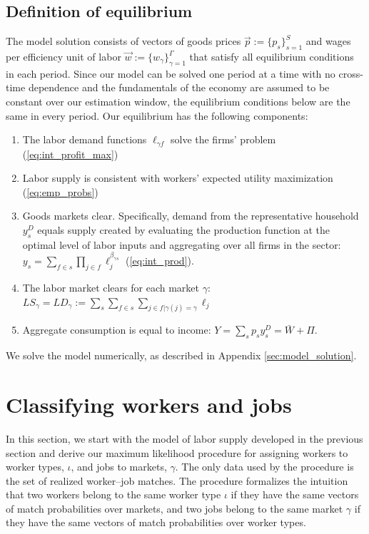 \documentclass[12pt]{article}
\def\g{\gamma}
\def\i{\iota}
\theoremstyle{definition}
\theoremstyle{plain}
\begin{document}
\subsection{Definition of equilibrium}


The model solution consists of vectors of goods prices $\vec{p} := \{p_{s}\}_{s=1}^S$ and wages per efficiency unit of labor $\vec{w} := \{w_{\g}\}_{\g=1}^\Gamma$ that satisfy all equilibrium conditions in each period. Since our model can be solved one period at a time with no cross-time dependence and the fundamentals of the economy are assumed to be constant over our estimation window, the equilibrium conditions below are the same in every period. Our equilibrium has the following components:
\begin{enumerate} 
	\item The labor demand functions $\ell_{\g f}$ solve the firms' problem (\ref{eq:int_profit_max})
	\item Labor supply is consistent with workers' expected utility maximization (\ref{eq:emp_probs})
	\item Goods markets clear. Specifically, demand from the representative household $y_s^D$ equals supply created by evaluating the production function at the optimal level of labor inputs and aggregating over all firms in the sector: $y_s = \sum_{f \in s} \prod_{j \in f} \ell_{j}^{\beta_{\g s}} $ (\ref{eq:int_prod}).
	\item The labor market clears for each market $\g$: $LS_\g = LD_\g := \sum_s \sum_{f \in s} \sum_{j \in f | \g(j)=\g} \ell_{j}$
	\item Aggregate consumption is equal to income: $Y = \sum_{s} p_s y_s^D = \bar W + \Pi$.
\end{enumerate}
We solve the model numerically, as described in Appendix \ref{sec:model_solution}. 


\section{Classifying workers and jobs}


In this section, we start with the model of labor supply developed in the previous section and derive our maximum likelihood procedure for assigning workers to worker types, $\i$, and jobs to markets, $\g$. The only data used by the procedure is the set of realized worker--job matches. The procedure formalizes the intuition that two workers belong to the same worker type $\i$ if they have the same vectors of match probabilities over markets, and two jobs belong to the same market $\g$ if they have the same vectors of match probabilities over worker types.
\end{document}
